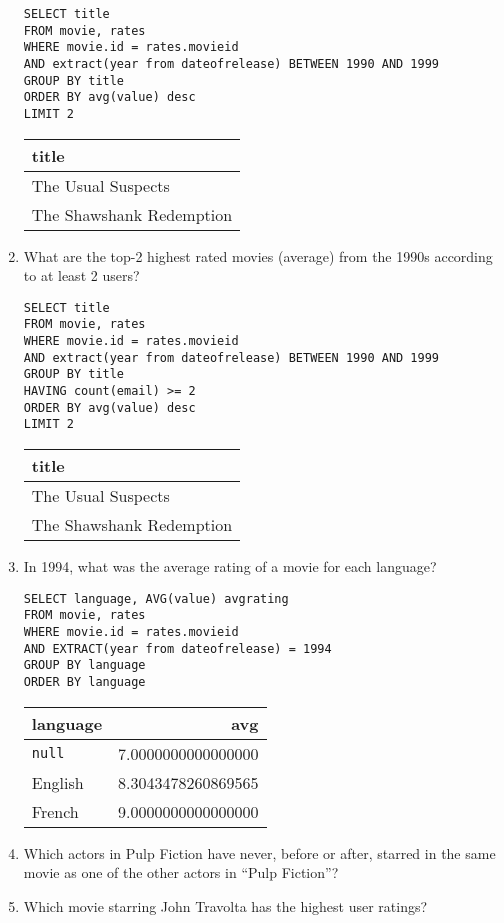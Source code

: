 \begin{enumerate}
\begin{lstlisting}
SELECT title
FROM movie, rates
WHERE movie.id = rates.movieid
AND extract(year from dateofrelease) BETWEEN 1990 AND 1999
GROUP BY title
ORDER BY avg(value) desc
LIMIT 2
\end{lstlisting}

\begin{tabular}{|l|}
\hline
title \\ \hline
The Usual Suspects \\ \hline
The Shawshank Redemption \\ \hline
\end{tabular}

\item What are the top-2 highest rated movies (average) from the 1990s according to at least 2 users?

\begin{lstlisting}
SELECT title
FROM movie, rates
WHERE movie.id = rates.movieid
AND extract(year from dateofrelease) BETWEEN 1990 AND 1999
GROUP BY title
HAVING count(email) >= 2
ORDER BY avg(value) desc
LIMIT 2
\end{lstlisting}

\begin{tabular}{|l|}
\hline
title \\ \hline
The Usual Suspects \\ \hline
The Shawshank Redemption \\ \hline
\end{tabular}

\item In 1994, what was the average rating of a movie for each language?

\begin{lstlisting}
SELECT language, AVG(value) avgrating
FROM movie, rates
WHERE movie.id = rates.movieid
AND EXTRACT(year from dateofrelease) = 1994
GROUP BY language
ORDER BY language
\end{lstlisting}

\begin{tabular}{|l|r|}
\hline
language & avg \\ \hline
\texttt{null} & 7.0000000000000000 \\ \hline
English & 8.3043478260869565 \\ \hline
French & 9.0000000000000000 \\ \hline
\end{tabular}

\item Which actors in Pulp Fiction have never, before or after, starred in the same movie as one of the other actors in “Pulp Fiction”?
\item Which movie starring John Travolta has the highest user ratings?


\end{enumerate}
